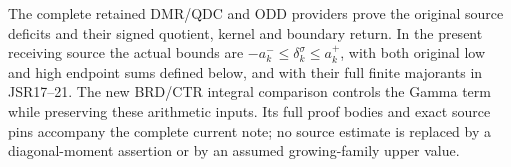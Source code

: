 The complete retained DMR/QDC and ODD providers prove the
original source deficits and their signed quotient, kernel and
boundary return. In the present receiving source the actual bounds
are $-a_k^-\leq\delta_k^\sigma\leq a_k^+$, with both original
low and high endpoint sums defined below, and with their full
finite majorants in JSR17--21. The new BRD/CTR integral comparison
controls the Gamma term while preserving these arithmetic inputs.
Its full proof bodies and exact source pins accompany the complete
current note; no source estimate is replaced by a diagonal-moment
assertion or by an assumed growing-family upper value.